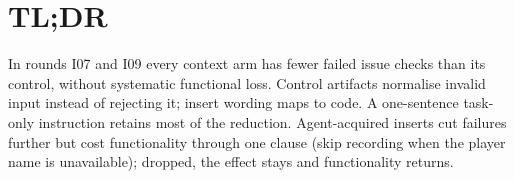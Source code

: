 \section*{TL;DR}
\noindent
In rounds I07 and I09 every context arm has fewer failed issue checks than its
control, without systematic functional loss. Control artifacts normalise
invalid input instead of rejecting it; insert wording maps to code. A
one-sentence task-only instruction retains most of the reduction.
Agent-acquired inserts cut failures further but cost functionality through one
clause (skip recording when the player name is unavailable); dropped, the
effect stays and functionality returns.
